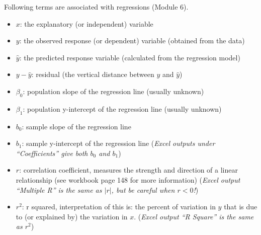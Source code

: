 \documentclass[12pt]{article}
\begin{document}
\noindent Following terms are associated with regressions (Module 6).
\vspace{-3mm}
\begin{itemize}\itemsep0em
	\item $x$: the explanatory (or independent) variable
	\item $y$: the observed response (or dependent) variable (obtained from the data)
	\item $\hat{y}$: the predicted response variable (calculated from the regression model)
	\item $y - \hat{y}$: residual (the vertical distance between $y$ and $\hat{y}$)
	\item $\beta_0$: population slope of the regression line (usually unknown)
	\item $\beta_1$: population y-intercept of the regression line (usually unknown)
	\item $b_0$: sample slope of the regression line
	\item $b_1$: sample y-intercept of the regression line (\textit{Excel outputs under ``\textit{Coefficients}'' give both $b_0$ and $b_1$})
	\item $r$: correlation coefficient, measures the strength and direction of a linear relationship (see workbook page 148 for more information) (\textit{Excel output ``Multiple R'' is the same as $|r|$, but be careful when $r < 0$!})
	\item $r^2$: r squared, interpretation of this is: the percent of variation in $y$ that is due to (or explained by) the variation in $x$. (\textit{Excel output ``R Square'' is the same as $r^2$})
\end{itemize}
\end{document}
